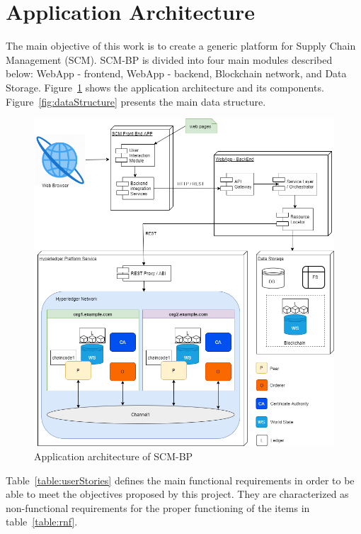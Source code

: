 \section{Application Architecture}\label{sec:applicationArchitecture}

The main objective of this work is to create a generic platform for Supply Chain Management (SCM). \ac{SCM-BP} is divided into four main modules described below: WebApp - frontend, WebApp - backend, Blockchain network, and Data Storage. Figure~\ref{fig:detalhamentotecnico} shows the application architecture and its components. Figure~\ref{fig:dataStructure} presents the main data structure.

\begin{figure}[htbp]
\begin{center}
  \includegraphics[scale=0.55]{images/architecture.png}
\caption{Application architecture of \ac{SCM-BP}}
\label{fig:detalhamentotecnico}
\end{center}
\end{figure}

Table~\ref{table:userStories} defines the main functional requirements in order to be able to meet the objectives proposed by this project. They are characterized as non-functional requirements for the proper functioning of the items in table~\ref{table:rnf}.






